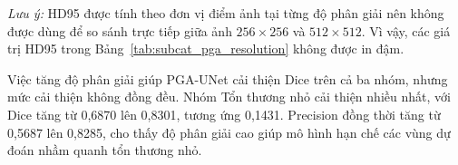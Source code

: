 \begin{table}[H]
    \centering
    \caption{Ảnh hưởng của độ phân giải đối với PGA-UNet theo đặc tính tổn thương trên BTXRD (Bao trọn, 50 ảnh/nhóm)}
    \label{tab:subcat_pga_resolution}
    \renewcommand{\arraystretch}{1.3}
\end{table}

\textit{Lưu ý:} HD95 được tính theo đơn vị điểm ảnh tại từng độ phân giải nên không được dùng để so sánh trực tiếp giữa ảnh $256\times256$ và $512\times512$. Vì vậy, các giá trị HD95 trong Bảng~\ref{tab:subcat_pga_resolution} không được in đậm.

Việc tăng độ phân giải giúp PGA-UNet cải thiện Dice trên cả ba nhóm, nhưng mức cải thiện không đồng đều. Nhóm Tổn thương nhỏ cải thiện nhiều nhất, với Dice tăng từ 0,6870 lên 0,8301, tương ứng 0,1431. Precision đồng thời tăng từ 0,5687 lên 0,8285, cho thấy độ phân giải cao giúp mô hình hạn chế các vùng dự đoán nhầm quanh tổn thương nhỏ.


